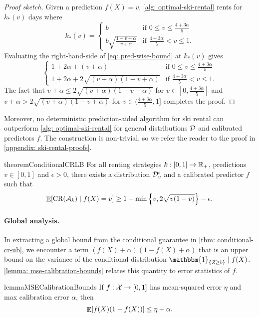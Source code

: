 \begin{proof}[Proof sketch] 
Given a prediction $f(X)=v$, \cref{alg: optimal-ski-rental} rents for $k_*(v)$ days where
\[k_*(v) = \begin{cases}
        b &\text{if $0 \leq v \leq \frac{4 + 3\alpha}{5}$} \\
        b \sqrt{\frac{1-v+\alpha}{v+\alpha}} &\text{if $\frac{4 + 3\alpha}{5} < v \leq 1$}.
    \end{cases}\]
Evaluating the right-hand-side of \cref{eq: pred-wise-bound} at $k_*(v)$  gives
    \[\begin{cases}
        1+2\alpha + (v+\alpha) &\text{if $0 \leq v \leq \frac{4 + 3\alpha}{5}$} \\
        1+2\alpha +2\sqrt{(v+\alpha)(1-v+\alpha)} &\text{if $\frac{4 + 3\alpha}{5} < v \leq 1$.}
    \end{cases}\]
    The fact that $v + \alpha \leq 2\sqrt{(v+\alpha)(1-v+\alpha)}$ for $v \in [0, \frac{4+3\alpha}{5}]$ and $v + \alpha > 2\sqrt{(v+\alpha)(1-v+\alpha)}$ for $v \in (\frac{4+3\alpha}{5}, 1]$ completes the proof.
\end{proof}
Moreover, no deterministic prediction-aided algorithm for ski rental can outperform \cref{alg: optimal-ski-rental} for general distributions $\mathcal{D}$ and calibrated predictors $f$. The construction is non-trivial, so we refer the reader to the proof in  \cref{appendix: ski-rental-proofs}.
\begin{restatable}{theorem}{ConditionalCRLB} \label{thm: conditional-cr-lb}
     For all renting strategies $k:[0,1] \to \mathbb{R}_+$, predictions $v \in [0,1]$ and $\epsilon > 0$, there exists a distribution $\mathcal{D}_{v}^\epsilon$ and a calibrated predictor $f$ such that 
    \[\mathop{\mathbb{E}}[\textnormal{CR}(\mathcal{A}_k) \mid f(X) = v] \geq 1+ \min\left\{v, 2\sqrt{v(1-v)}\right\} -\epsilon.\]
\end{restatable}

\paragraph{Global analysis.} In extracting a global bound from the conditional guarantee in \cref{thm: conditional-cr-ub}, we encounter a term $(f(X)+\alpha)(1-f(X)+\alpha)$ that is an upper bound on the variance of the conditional distribution $\mathbbm{1}_{\{Z \geq b\}} \mid f(X)$. \cref{lemma: mse-calibration-bounds} relates this quantity to error statistics of $f$.
\begin{restatable}{lemma}{MSECalibrationBounds} \label{lemma: mse-calibration-bounds}
     If $f: \mathcal{X} \to [0,1]$ has mean-squared error $\eta$ and max calibration error $\alpha$, then
\[\mathop{\mathbb{E}}[f(X)(1-f(X))] \leq \eta + \alpha.\]
\end{restatable}

